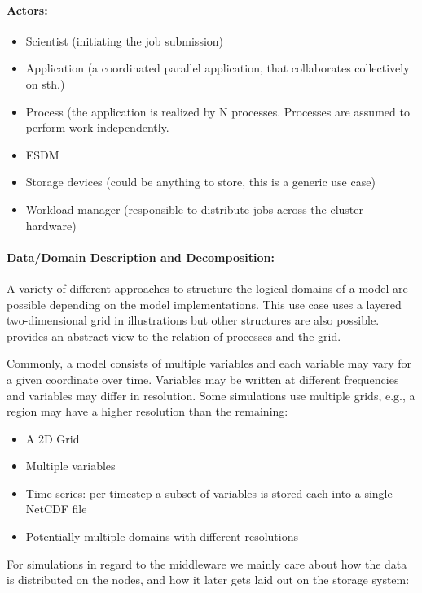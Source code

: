 \paragraph{Actors:}
\begin{itemize}
	\item Scientist (initiating the job submission)
	\item Application (a coordinated parallel application, that collaborates collectively on sth.)
	\item Process (the application is realized by N processes. Processes are assumed to perform work independently.
	\item ESDM
	\item Storage devices (could be anything to store, this is a generic use case)
	\item Workload manager (responsible to distribute jobs across the cluster hardware)
\end{itemize}


\paragraph{Data/Domain Description and Decomposition:}
A variety of different approaches to structure the logical domains of a model are possible depending on the model implementations.
This use case uses a layered two-dimensional grid in illustrations but other structures are also possible.
 provides an abstract view to the relation of processes and the grid.

Commonly, a model consists of multiple variables and each variable may vary for a given coordinate over time.
Variables may be written at different frequencies and variables may differ in resolution.
Some simulations use multiple grids, e.g., a region may have a higher resolution than the remaining:

\begin{itemize}
	\item A 2D Grid
	\item Multiple variables
	\item Time series: per timestep a subset of variables is stored each into a single NetCDF file
	\item Potentially multiple domains with different resolutions
\end{itemize}


For simulations in regard to the middleware we mainly care about how the data is distributed on the nodes, and how it later gets laid out on the storage system:

